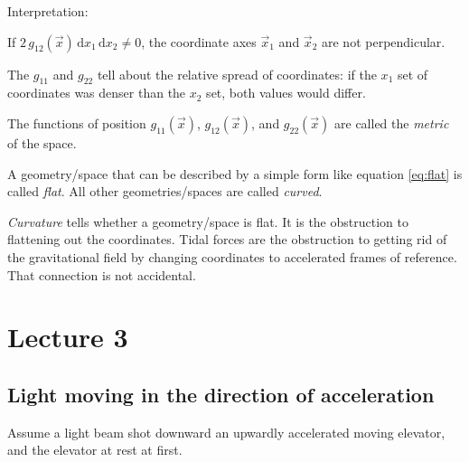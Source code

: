 \documentclass[pagesize,headsepline,10pt,parskip=half,BCOR=12mm]{scrreprt}
\begin{document}
      Interpretation:

      If $2\,g_{12}(\vec x)\,\mathrm{d}x_1\,
      \mathrm{d}x_2 \neq 0$, the coordinate axes
      $\vec x_1$ and $\vec x_2$ are not perpendicular.

      The $g_{11}$ and $g_{22}$ tell about the relative spread of
      coordinates: if the $x_1$ set of coordinates was denser
      than the $x_2$ set, both values would differ.

      The functions of position $g_{11}(\vec x)$, $g_{12}(\vec x)$,
      and $g_{22}(\vec x)$ are called the \emph{metric} of the
      space.

      A geometry/space that can be described by a simple form
      like equation \ref{eq:flat} is called \emph{flat}.
      All other geometries/spaces are called \emph{curved}.

      \emph{Curvature} tells whether a geometry/space is flat.  It
      is the obstruction to flattening out the coordinates.  Tidal forces
      are the obstruction to getting rid of the gravitational field
      by changing coordinates to accelerated frames of reference.
      That connection is not accidental.

  \chapter{Lecture 3}
    \section{Light moving in the direction of acceleration}
      Assume a light beam shot downward an upwardly accelerated
      moving elevator, and the elevator at rest at first.
\end{document}
